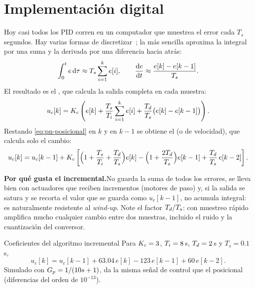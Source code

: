 \section{Implementación digital}
\label{sec:pn-digital}

Hoy casi todos los PID corren en un computador que muestrea el error cada $T_s$ segundos. Hay varias formas de discretizar~\citep{AsWi97}; la más sencilla aproxima la integral por una suma y la derivada por una diferencia hacia atrás:
\[
  \int_0^t e\,\mathrm{d}\tau\approx T_s\sum_{i=1}^{k}e[i],\qquad \frac{\mathrm{d} e}{\mathrm{d} t}\approx\frac{e[k]-e[k-1]}{T_s}.
\]
El resultado es el , que calcula la salida completa en cada muestra:
\begin{equation}
  u_c[k]=K_c\left(e[k]+\frac{T_s}{T_i}\sum_{i=1}^{k}e[i]+\frac{T_d}{T_s}\bigl(e[k]-e[k-1]\bigr)\right).
  \label{eq:pn-posicional}
\end{equation}
Restando \eqref{eq:pn-posicional} en $k$ y en $k-1$ se obtiene el  (o de velocidad), que calcula solo el cambio:
\begin{equation}
  u_c[k]=u_c[k-1]+K_c\left[\Bigl(1+\frac{T_s}{T_i}+\frac{T_d}{T_s}\Bigr)e[k]-\Bigl(1+\frac{2T_d}{T_s}\Bigr)e[k-1]+\frac{T_d}{T_s}\,e[k-2]\right].
  \label{eq:pn-incremental}
\end{equation}

\begin{ideaclave}
\textbf{Por qué gusta el incremental.}\enspace No guarda la suma de todos los errores, se lleva bien con actuadores que reciben incrementos (motores de paso) y, si la salida se satura y se recorta el valor que se guarda como $u_c[k-1]$, no acumula integral: es naturalmente resistente al \emph{wind-up}. Note el factor $T_d/T_s$: con muestreo rápido amplifica mucho cualquier cambio entre dos muestras, incluido el ruido y la cuantización del conversor.
\end{ideaclave}

\begin{ejemplo}[label=ej:pn-digital]{Coeficientes del algoritmo incremental}
Para $K_c=3$, $T_i=8$\,s, $T_d=2$\,s y $T_s=0.1$\,s,
\[
  u_c[k]=u_c[k-1]+63.04\,e[k]-123\,e[k-1]+60\,e[k-2].
\]
Simulado con $G_p=1/(10s+1)$, da la misma señal de control que el posicional (diferencias del orden de $10^{-13}$).
\end{ejemplo}


